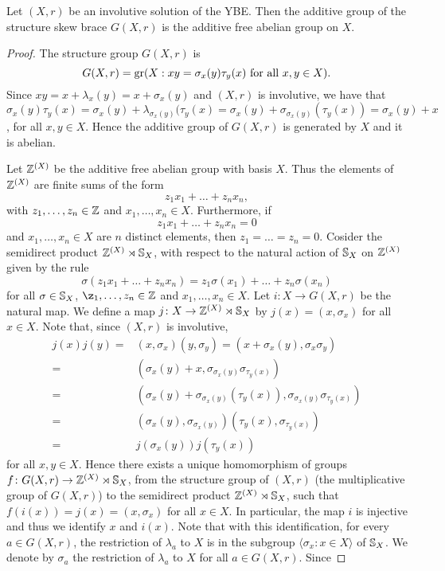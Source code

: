 \begin{theorem}\label{thm:involstruct}
Let $(X,r)$ be an involutive solution of the YBE. Then the additive group of the structure skew brace $G(X,r)$ is the additive free abelian group on $X$.
\end{theorem}

\begin{proof}
The structure group $G(X,r)$ is
\[ G(X,r)=\operatorname{gr}(X : xy=\sigma_x(y)\tau_y(x)\text{ for all }x,y\in X ).\]
Since $xy=x+\lambda_x(y)=x+\sigma_x(y)$ and $(X,r)$ is involutive, we have that $\sigma_x(y)\tau_y(x)=\sigma_x(y)+\lambda_{\sigma_x(y)}(\tau_y(x)=\sigma_x(y)+\sigma_{\sigma_x(y)}(\tau_y(x))=\sigma_x(y)+x$,
for all $x,y\in X$. Hence the additive group of $G(X,r)$ is generated by $X$ and it is abelian.

Let $\mathbb{Z}^{(X)}$ be the additive free abelian group with basis $X$. Thus the elements of $\mathbb{Z}^{(X)}$ are finite sums of the form
\[ z_1x_1+\dots +z_nx_n,\]
with $z_1,\dots ,z_n\in\mathbb{Z}$ and $x_1,\dots ,x_n\in X$. Furthermore, if 
\[ z_1x_1+\dots +z_nx_n=0\]
and $x_1,\dots ,x_n\in X$ are $n$ distinct elements, then $z_1=\dots =z_n=0$. Cosider the semidirect product $\mathbb{Z}^{(X)}\rtimes \mathbb{S}_X$, with respect to the natural action of $\mathbb{S}_X$ on $\mathbb{Z}^{(X)}$ given by the rule
\[ \sigma(z_1x_1+\dots +z_nx_n)=z_1\sigma(x_1)+\dots +z_n\sigma(x_n)\]
for all $\sigma\in\mathbb{S}_X$, $\z_1,\dots ,z_n\in\Z$ and $x_1,\dots,x_n\in X$. Let $i\colon X\to G(X,r)$ be the natural map.
We define a map $j\colon X\to \mathbb{Z}^{(X)}\rtimes \mathbb{S}_X$ by $j(x)=(x,\sigma_x)$ for all $x\in X$. Note that, since $(X,r)$ is involutive, 
\begin{align*}
    j(x)j(y)=&(x,\sigma_x)(y,\sigma_y)=(x+\sigma_x(y),\sigma_x\sigma_y)\\
    =&(\sigma_x(y)+x,\sigma_{\sigma_x(y)}\sigma_{\tau_y(x)})\\
    =&(\sigma_x(y)+\sigma_{\sigma_x(y)}(\tau_y(x)),\sigma_{\sigma_x(y)}\sigma_{\tau_y(x)})\\
    =&(\sigma_x(y),\sigma_{\sigma_x(y)})(\tau_y(x),\sigma_{\tau_y(x)})\\
    =&j(\sigma_x(y))j(\tau_y(x))
\end{align*}
for all $x,y\in X$. Hence there exists a unique homomorphism of groups  
$f\colon G(X,r)\to \mathbb{Z}^{(X)}\rtimes \mathbb{S}_X$, from the structure group of $(X,r)$ (the multiplicative group of $G(X,r)$) to the semidirect product $\mathbb{Z}^{(X)}\rtimes \mathbb{S}_X$, such that $f(i(x))=j(x)=(x,\sigma_x)$ for all $x\in X$. In particular, the map $i$ is injective and thus we identify $x$ and $i(x)$. Note that with this identification, for every $a\in G(X,r)$, the restriction of $\lambda_a$ to $X$ is in the subgroup $\langle \sigma_x :x\in X\rangle$ of $\mathbb{S}_X$. We denote by $\sigma_a$ the restriction of $\lambda_a$ to $X$ for all $a\in G(X,r)$.  Since

\end{proof}
